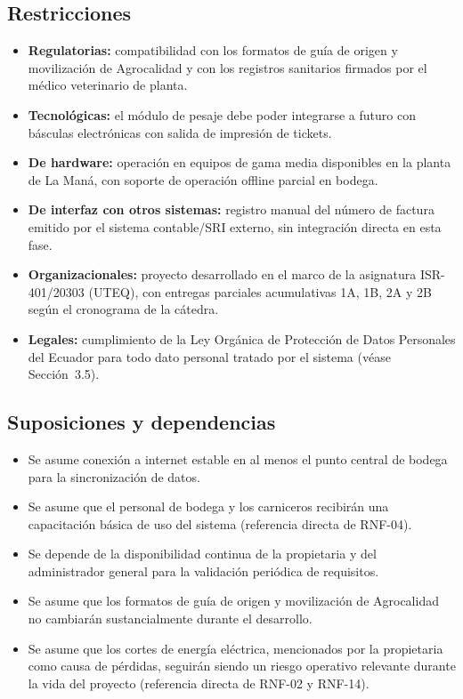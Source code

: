\documentclass[11pt,a4paper]{article}
\begin{document}
\subsection{Restricciones}
\begin{itemize}[nosep]
\item \textbf{Regulatorias:} compatibilidad con los formatos de guía de origen y movilización de Agrocalidad y con los registros sanitarios firmados por el médico veterinario de planta.
\item \textbf{Tecnológicas:} el módulo de pesaje debe poder integrarse a futuro con básculas electrónicas con salida de impresión de tickets.
\item \textbf{De hardware:} operación en equipos de gama media disponibles en la planta de La Maná, con soporte de operación offline parcial en bodega.
\item \textbf{De interfaz con otros sistemas:} registro manual del número de factura emitido por el sistema contable/SRI externo, sin integración directa en esta fase.
\item \textbf{Organizacionales:} proyecto desarrollado en el marco de la asignatura ISR-401/20303 (UTEQ), con entregas parciales acumulativas 1A, 1B, 2A y 2B según el cronograma de la cátedra.
\item \textbf{Legales:} cumplimiento de la Ley Orgánica de Protección de Datos Personales del Ecuador \cite{lopd2021} para todo dato personal tratado por el sistema (véase Sección~3.5).
\end{itemize}

\subsection{Suposiciones y dependencias}
\begin{itemize}[nosep]
\item Se asume conexión a internet estable en al menos el punto central de bodega para la sincronización de datos.
\item Se asume que el personal de bodega y los carniceros recibirán una capacitación básica de uso del sistema (referencia directa de RNF-04).
\item Se depende de la disponibilidad continua de la propietaria y del administrador general para la validación periódica de requisitos.
\item Se asume que los formatos de guía de origen y movilización de Agrocalidad no cambiarán sustancialmente durante el desarrollo.
\item Se asume que los cortes de energía eléctrica, mencionados por la propietaria como causa de pérdidas, seguirán siendo un riesgo operativo relevante durante la vida del proyecto (referencia directa de RNF-02 y RNF-14).
\end{itemize}
\end{document}
